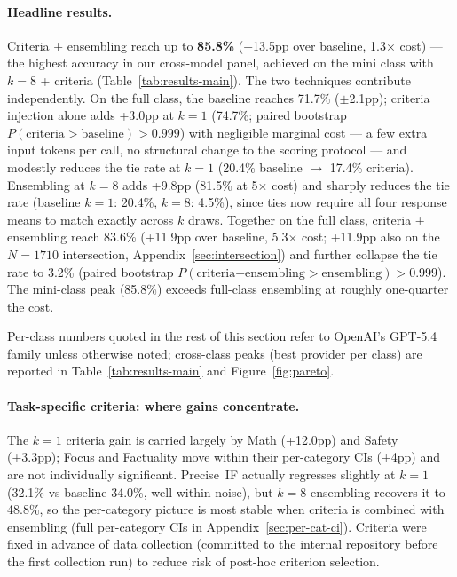 \documentclass{article}
\begin{document}
\paragraph{Headline results.} Criteria + ensembling reach up to \textbf{85.8\%} (+13.5pp over baseline, 1.3$\times$ cost) --- the highest accuracy in our cross-model panel, achieved on the mini class with $k{=}8$ + criteria (Table~\ref{tab:results-main}). The two techniques contribute independently. On the full class, the baseline reaches 71.7\% ($\pm$2.1pp); criteria injection alone adds +3.0pp at $k{=}1$ (74.7\%; paired bootstrap $P(\text{criteria} > \text{baseline}) > 0.999$) with negligible marginal cost --- a few extra input tokens per call, no structural change to the scoring protocol --- and modestly reduces the tie rate at $k{=}1$ (20.4\% baseline $\to$ 17.4\% criteria). Ensembling at $k{=}8$ adds +9.8pp (81.5\% at 5$\times$ cost) and sharply reduces the tie rate (baseline $k{=}1$: 20.4\%, $k{=}8$: 4.5\%), since ties now require all four response means to match exactly across $k$ draws. Together on the full class, criteria + ensembling reach 83.6\% (+11.9pp over baseline, 5.3$\times$ cost; +11.9pp also on the $N{=}1710$ intersection, Appendix~\ref{sec:intersection}) and further collapse the tie rate to 3.2\% (paired bootstrap $P(\text{criteria+ensembling} > \text{ensembling}) > 0.999$). The mini-class peak (85.8\%) exceeds full-class ensembling at roughly one-quarter the cost.

Per-class numbers quoted in the rest of this section refer to OpenAI's GPT-5.4 family unless otherwise noted; cross-class peaks (best provider per class) are reported in Table~\ref{tab:results-main} and Figure~\ref{fig:pareto}.

\paragraph{Task-specific criteria: where gains concentrate.} The $k{=}1$ criteria gain is carried largely by Math (+12.0pp) and Safety (+3.3pp); Focus and Factuality move within their per-category CIs ($\pm$4pp) and are not individually significant. Precise~IF actually regresses slightly at $k{=}1$ (32.1\% vs baseline 34.0\%, well within noise), but $k{=}8$ ensembling recovers it to 48.8\%, so the per-category picture is most stable when criteria is combined with ensembling (full per-category CIs in Appendix~\ref{sec:per-cat-ci}). Criteria were fixed in advance of data collection (committed to the internal repository before the first collection run) to reduce risk of post-hoc criterion selection.
\end{document}
